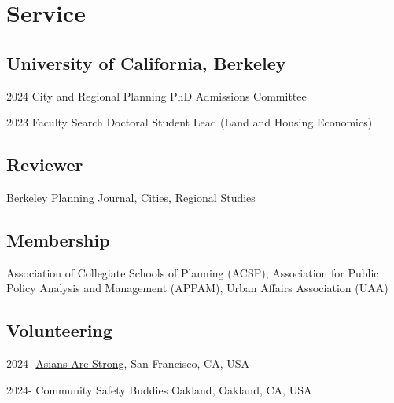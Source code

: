 \documentclass[12pt,letterpaper]{report}
\begin{document}
  \section*{Service}
  \subsection*{University of California, Berkeley}
    \begin{tablist}
        \item[2024] \tab{}City and Regional Planning PhD Admissions Committee
        \item[2023] \tab{}Faculty Search Doctoral Student Lead (Land and Housing Economics)
    \end{tablist}
  \subsection*{Reviewer}
    Berkeley Planning Journal, Cities, Regional Studies
  \subsection*{Membership}
    Association of Collegiate Schools of Planning (ACSP), Association for Public Policy Analysis and Management (APPAM), Urban Affairs Association (UAA)
  \subsection*{Volunteering}
    \begin{tablist}
        \item[2024-] \tab{}\href{https://asiansarestrong.org/}{Asians Are Strong}, San Francisco, CA, USA
        \item[2024-] \tab{}Community Safety Buddies Oakland, Oakland, CA, USA
    \end{tablist}
\end{document}
